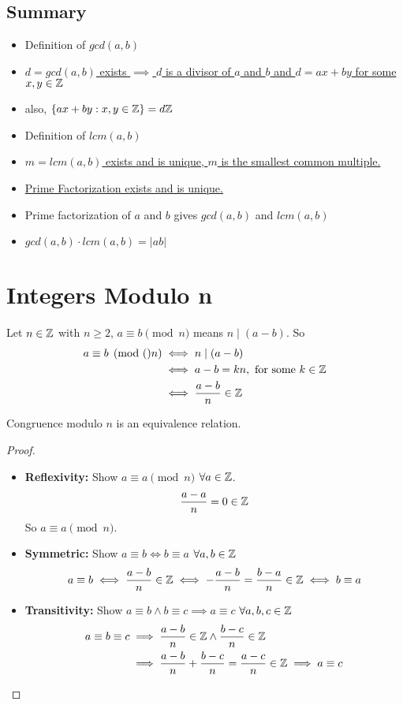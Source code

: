 \documentclass[openany]{report}
\begin{document}
\subsection{Summary}
\begin{itemize}
    \item Definition of \hyperref[def:gcd]{$gcd(a,b)$}
    \item \hyperref[thm:gcd]{$d=gcd(a,b)$ exists $\implies$ $d$ is a divisor of $a$ and $b$ and $d = ax + by$ for some $x,y \in \mathbb{Z}$}
    \item also, $\{ax + by : x,y \in \mathbb{Z} \} = d \mathbb{Z}$
    \item Definition of \hyperref[def:lcm]{$lcm(a,b)$}
    \item \hyperref[thm:lcm]{$m = lcm(a,b)$ exists and is unique, $m$ is the smallest common multiple.}
    \item \hyperref[thm:primefactorization]{Prime Factorization exists and is unique.}
    \item Prime factorization of $a$ and $b$ gives \hyperref[primefactorization:gcd]{$gcd(a,b)$} and \hyperref[primefactorization:lcm]{$lcm(a,b)$}
    \item $gcd(a,b) \cdot lcm(a,b) = |ab|$
\end{itemize}
\noindent
\section{Integers Modulo n}
Let $n \in \mathbb{Z}$ with $n \geq 2$, $a \equiv b \pmod{n}$ means $n \mid (a-b)$. So 
\begin{align*}
    a\equiv b \pmod(n) &\iff n \mid (a-b)\\
                    &\iff a-b = kn, \text{ for some } k \in \mathbb{Z}\\
                    &\iff \frac{a-b}{n}\in \mathbb{Z}
\end{align*}
\begin{prop}
    Congruence modulo $n$ is an equivalence relation.
\end{prop}
\begin{proof}
    ~\newline
    \begin{itemize}
        \item \textbf{Reflexivity:} Show $a \equiv a \pmod{n}$ $\forall a \in \mathbb{Z}$. \[\frac{a - a}{n} = 0 \in \mathbb{Z}\] So $a \equiv a \pmod{n}$.
        \item \textbf{Symmetric:} Show $a \equiv b \iff b \equiv a$ $\forall a,b \in \mathbb{Z}$\[a \equiv b \iff \frac{a-b}{n}\in \mathbb{Z} \iff - \frac{a-b}{n}= \frac{b-a}{n}\in \mathbb{Z} \iff b\equiv a\]
        \item \textbf{Transitivity:} Show $a \equiv b \wedge b \equiv c \implies a \equiv c$ $\forall a,b,c \in \mathbb{Z}$\\
        \begin{align*}
            a \equiv b \equiv c &\implies \frac{a-b}{n}\in \mathbb{Z} \wedge \frac{b-c}{n}\in \mathbb{Z}\\
            &\implies \frac{a-b}{n} + \frac{b-c}{n} = \frac{a-c}{n}\in \mathbb{Z} \implies a \equiv c
        \end{align*}
    \end{itemize}
\end{proof}
\end{document}
